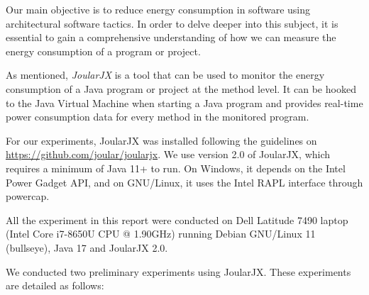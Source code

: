 
Our main objective is to reduce energy consumption in software using architectural software tactics. In order to delve deeper into this subject, it is essential to gain a comprehensive understanding of how we can measure the energy consumption of a program or project.

\vspace{.5em}
As mentioned, \textit{JoularJX} is a tool that can be used to monitor the energy consumption of a Java program or project at the method level. It can be hooked to the Java Virtual Machine when starting a Java program and provides real-time power consumption data for every method in the monitored program.

\vspace{.5em}
For our experiments, JoularJX was installed following the guidelines on \url{https://github.com/joular/joularjx}. We use version 2.0 of JoularJX, which requires a minimum of Java 11+ to run. On Windows, it depends on the Intel Power Gadget API, and on GNU/Linux, it uses the Intel RAPL interface through powercap.

\vspace{.5em}
All the experiment in this report were conducted on Dell Latitude 7490 laptop (Intel Core i7-8650U CPU @ 1.90GHz) running Debian GNU/Linux 11 (bullseye), Java 17 and JoularJX 2.0.

\vspace{.5em}
We conducted two preliminary experiments using JoularJX. These experiments are detailed as follows:





